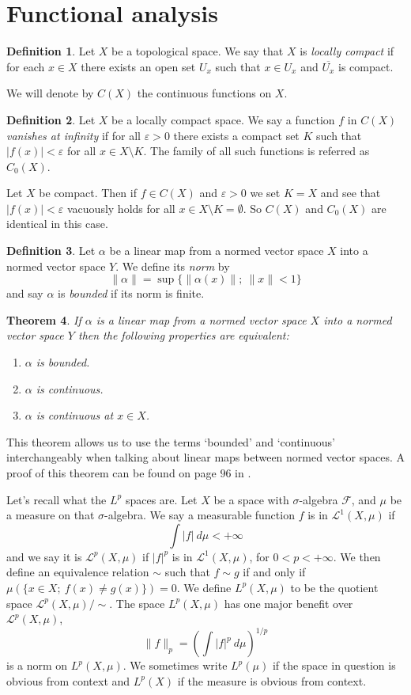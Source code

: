 \documentclass[a4paper,12pt,twoside,BCOR=10mm]{scrbook}
\newtheorem{theorem}{Theorem}[section]
\theoremstyle{definition}
\theoremstyle{definition}
\theoremstyle{definition}
\newtheorem{definition}[theorem]{Definition}
\begin{document}
\section{Functional analysis}
\begin{definition}
\label{index10}
Let $X$ be a topological space.
We say that $X$ is \emph{locally compact} if for each $x \in X$ there exists an open set $U_x$ such that $x \in U_x$ and $\overline{U_x}$ is compact.
\end{definition}
\label{index11}
We will denote by $C(X)$ the continuous functions on $X$.
\begin{definition}
\label{index12}
Let $X$ be a locally compact space.
We say a function $f$ in $C(X)$ \emph{vanishes at infinity} if for all $\varepsilon > 0$ there exists a compact set $K$ such that $|f(x)| < \varepsilon$ for all $x \in X \setminus K$.
The family of all such functions is referred as $C_0(X)$.
\end{definition}
Let $X$ be compact.
Then if $f \in C(X)$ and $\varepsilon > 0$ we set $K = X$ and see that $|f(x)| < \varepsilon$ vacuously holds for all $x \in X \setminus K = \emptyset$.
So $C(X)$ and $C_0(X)$ are identical in this case.
\begin{definition}
\label{index13}
Let $\alpha$ be a linear map from a normed vector space $X$ into a normed vector space $Y$.
We define its \emph{norm} by
\[
	\|\alpha\| = \sup\{\|\alpha(x)\|;\ \|x\| < 1\}
\]
and say $\alpha$ is \emph{bounded} if its norm is finite.
\end{definition}
\begin{theorem}
If $\alpha$ is a linear map from a normed vector space $X$ into a normed vector space $Y$ then the following properties are equivalent:
\begin{enumerate}
\item[\emph{(i)}] $\alpha$ is bounded.
\item[\emph{(ii)}] $\alpha$ is continuous.
\item[\emph{(iii)}] $\alpha$ is continuous at $x \in X$.
\end{enumerate}
\end{theorem}
This theorem allows us to use the terms `bounded' and `continuous' interchangeably when talking about linear maps between normed vector spaces.
A proof of this theorem can be found on page $96$ in \citep{rudin2}.

\label{index14}
Let's recall what the $L^p$ spaces are.
Let $X$ be a space with $\sigma$-algebra $\mathcal{F}$, and $\mu$ be a measure on that $\sigma$-algebra.
We say a measurable function $f$ is in $\mathcal{L}^1(X, \mu)$ if
\[
	\int |f|\ d\mu < +\infty
\]
and we say it is $\mathcal{L}^p(X, \mu)$ if $|f|^p$ is in $\mathcal{L}^1(X, \mu)$, for $0 < p < +\infty$.
We then define an equivalence relation $\sim$ such that $f \sim g$ if and only if $\mu(\{x \in X;\ f(x) \neq g(x)\}) = 0$.
We define $L^p(X, \mu)$ to be the quotient space $\mathcal{L}^p(X, \mu)/\sim$.
The space $L^p(X, \mu)$ has one major benefit over $\mathcal{L}^p(X, \mu)$,
\[
\label{index15}
	\|f\|_p = 
	\left ( \int |f|^p\ d\mu \right )^{1/p}
\]
is a norm on $L^p(X, \mu)$.
We sometimes write $L^p(\mu)$ if the space in question is obvious from context and $L^p(X)$ if the measure is obvious from context.
\end{document}
